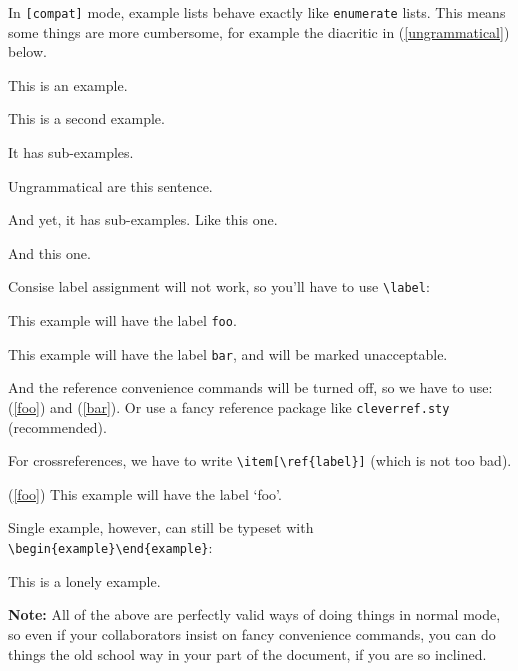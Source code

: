 \documentclass{article}
\begin{document}
%
\noindent In \verb|[compat]| mode, example lists behave exactly
like \verb|enumerate| lists. This means some things are more cumbersome,
for example the diacritic in (\ref{ungrammatical}) below.
    \begin{examples}
        \item This is an example.
        \item This is a second example.
              \begin{examples}
                  \item It has sub-examples.
                  \item \diacritic{*} Ungrammatical are this sentence.\label{ungrammatical}
                        \begin{examples}
                            \item And yet, it has sub-examples. Like this one.
                            \item And this one.
                        \end{examples}
              \end{examples}
    \end{examples}
Consise label assignment will not work, so you'll have to use \verb|\label|:
\begin{examples}
    \item\label{foo} This example will have the label \verb|foo|.
    \item\label{bar}\diacritic{\#} This example will have the label \verb|bar|, and will be marked 
                unacceptable.
\end{examples}
%
And the reference convenience commands will be turned off, so we have to use: 
(\ref{foo}) and (\ref{bar}). Or use a fancy reference package like \verb|cleverref.sty| (recommended).

For crossreferences, we have to write \verb|\item[\ref{label}]| (which is not too bad).
\begin{examples}
    \item[(\ref{foo})] This example will have the label `foo'.
\end{examples}
%
Single example, however, can still be typeset with \verb|\begin{example}\end{example}|:
\begin{example}
    \item This is a lonely example.
\end{example}

\textbf{Note:} All of the above are perfectly valid ways of doing things in normal mode,
so even if your collaborators insist on fancy convenience commands, you can do things
the old school way in your part of the document, if you are so inclined.
\end{document}
